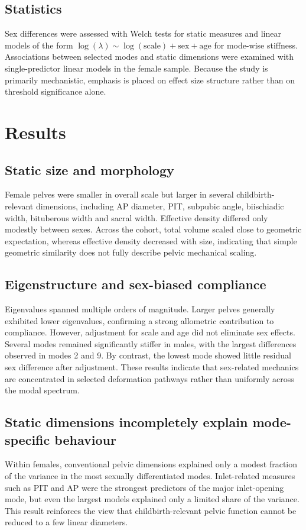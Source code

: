 \documentclass[fleqn,usenatbib]{rsproca_new}
\begin{document}
\subsection{Statistics}
Sex differences were assessed with Welch tests for static measures and linear models of the form $\log(\lambda) \sim \log(\mathrm{scale}) + \mathrm{sex} + \mathrm{age}$ for mode-wise stiffness. Associations between selected modes and static dimensions were examined with single-predictor linear models in the female sample. Because the study is primarily mechanistic, emphasis is placed on effect size structure rather than on threshold significance alone.

\section{Results}
\subsection{Static size and morphology}
Female pelves were smaller in overall scale but larger in several childbirth-relevant dimensions, including AP diameter, PIT, subpubic angle, biischiadic width, bituberous width and sacral width. Effective density differed only modestly between sexes. Across the cohort, total volume scaled close to geometric expectation, whereas effective density decreased with size, indicating that simple geometric similarity does not fully describe pelvic mechanical scaling.

\subsection{Eigenstructure and sex-biased compliance}
Eigenvalues spanned multiple orders of magnitude. Larger pelves generally exhibited lower eigenvalues, confirming a strong allometric contribution to compliance. However, adjustment for scale and age did not eliminate sex effects. Several modes remained significantly stiffer in males, with the largest differences observed in modes 2 and 9. By contrast, the lowest mode showed little residual sex difference after adjustment. These results indicate that sex-related mechanics are concentrated in selected deformation pathways rather than uniformly across the modal spectrum.

\subsection{Static dimensions incompletely explain mode-specific behaviour}
Within females, conventional pelvic dimensions explained only a modest fraction of the variance in the most sexually differentiated modes. Inlet-related measures such as PIT and AP were the strongest predictors of the major inlet-opening mode, but even the largest models explained only a limited share of the variance. This result reinforces the view that childbirth-relevant pelvic function cannot be reduced to a few linear diameters.
\end{document}
